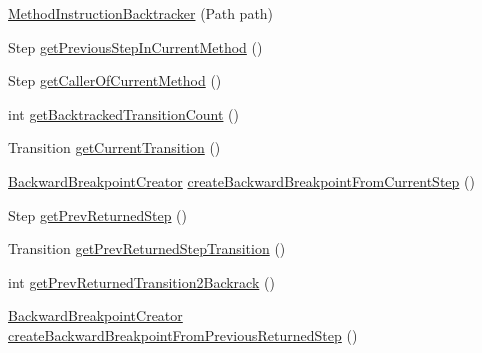 \begin{DoxyCompactItemize}
\item 
\hyperlink{classgov_1_1nasa_1_1jpf_1_1inspector_1_1server_1_1pathanalysis_1_1_method_instruction_backtracker_a31140e00cb7d9c887e4f0176c49e614e}{Method\+Instruction\+Backtracker} (Path path)
\item 
Step \hyperlink{classgov_1_1nasa_1_1jpf_1_1inspector_1_1server_1_1pathanalysis_1_1_method_instruction_backtracker_aad37dbd8f24f98e062d607dc410491f8}{get\+Previous\+Step\+In\+Current\+Method} ()
\item 
Step \hyperlink{classgov_1_1nasa_1_1jpf_1_1inspector_1_1server_1_1pathanalysis_1_1_method_instruction_backtracker_a634a770e0f5e74dc6fc7c5b76dd2c626}{get\+Caller\+Of\+Current\+Method} ()
\item 
int \hyperlink{classgov_1_1nasa_1_1jpf_1_1inspector_1_1server_1_1pathanalysis_1_1_method_instruction_backtracker_a549929cc0c3a3d8870438d9fd3110d65}{get\+Backtracked\+Transition\+Count} ()
\item 
Transition \hyperlink{classgov_1_1nasa_1_1jpf_1_1inspector_1_1server_1_1pathanalysis_1_1_method_instruction_backtracker_a50123fcc54c5662d995c577ba5f64805}{get\+Current\+Transition} ()
\item 
\hyperlink{classgov_1_1nasa_1_1jpf_1_1inspector_1_1server_1_1pathanalysis_1_1_backward_breakpoint_creator}{Backward\+Breakpoint\+Creator} \hyperlink{classgov_1_1nasa_1_1jpf_1_1inspector_1_1server_1_1pathanalysis_1_1_method_instruction_backtracker_af8ce463e47e4fb1420c795e48807d656}{create\+Backward\+Breakpoint\+From\+Current\+Step} ()
\item 
Step \hyperlink{classgov_1_1nasa_1_1jpf_1_1inspector_1_1server_1_1pathanalysis_1_1_method_instruction_backtracker_ac20c92113bb6b26bcf55bad01ac7f9da}{get\+Prev\+Returned\+Step} ()
\item 
Transition \hyperlink{classgov_1_1nasa_1_1jpf_1_1inspector_1_1server_1_1pathanalysis_1_1_method_instruction_backtracker_a946ab7835f69f67145086b1ce1a1cce9}{get\+Prev\+Returned\+Step\+Transition} ()
\item 
int \hyperlink{classgov_1_1nasa_1_1jpf_1_1inspector_1_1server_1_1pathanalysis_1_1_method_instruction_backtracker_aca112e10e8b54fd137ac4fe22fcfdfa4}{get\+Prev\+Returned\+Transition2\+Backrack} ()
\item 
\hyperlink{classgov_1_1nasa_1_1jpf_1_1inspector_1_1server_1_1pathanalysis_1_1_backward_breakpoint_creator}{Backward\+Breakpoint\+Creator} \hyperlink{classgov_1_1nasa_1_1jpf_1_1inspector_1_1server_1_1pathanalysis_1_1_method_instruction_backtracker_a27c62212b8c40821006569c59b2d32a4}{create\+Backward\+Breakpoint\+From\+Previous\+Returned\+Step} ()
\end{DoxyCompactItemize}
